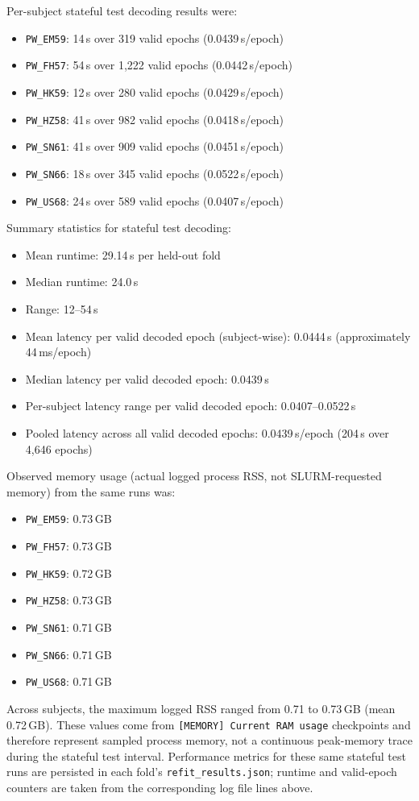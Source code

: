 Per-subject stateful test decoding results were:
\begin{itemize}
\item \texttt{PW\_EM59}: 14\,s over 319 valid epochs (0.0439\,s/epoch)
\item \texttt{PW\_FH57}: 54\,s over 1,222 valid epochs (0.0442\,s/epoch)
\item \texttt{PW\_HK59}: 12\,s over 280 valid epochs (0.0429\,s/epoch)
\item \texttt{PW\_HZ58}: 41\,s over 982 valid epochs (0.0418\,s/epoch)
\item \texttt{PW\_SN61}: 41\,s over 909 valid epochs (0.0451\,s/epoch)
\item \texttt{PW\_SN66}: 18\,s over 345 valid epochs (0.0522\,s/epoch)
\item \texttt{PW\_US68}: 24\,s over 589 valid epochs (0.0407\,s/epoch)
\end{itemize}

Summary statistics for stateful test decoding:
\begin{itemize}
\item Mean runtime: 29.14\,s per held-out fold
\item Median runtime: 24.0\,s
\item Range: 12--54\,s
\item Mean latency per valid decoded epoch (subject-wise): 0.0444\,s (approximately 44\,ms/epoch)
\item Median latency per valid decoded epoch: 0.0439\,s
\item Per-subject latency range per valid decoded epoch: 0.0407--0.0522\,s
\item Pooled latency across all valid decoded epochs: 0.0439\,s/epoch (204\,s over 4,646 epochs)
\end{itemize}
Observed memory usage (actual logged process RSS, not SLURM-requested memory) from the same runs was:
\begin{itemize}
\item \texttt{PW\_EM59}: 0.73\,GB
\item \texttt{PW\_FH57}: 0.73\,GB
\item \texttt{PW\_HK59}: 0.72\,GB
\item \texttt{PW\_HZ58}: 0.73\,GB
\item \texttt{PW\_SN61}: 0.71\,GB
\item \texttt{PW\_SN66}: 0.71\,GB
\item \texttt{PW\_US68}: 0.71\,GB
\end{itemize}
Across subjects, the maximum logged RSS ranged from 0.71 to 0.73\,GB (mean 0.72\,GB). These values come from \texttt{[MEMORY] Current RAM usage} checkpoints and therefore represent sampled process memory, not a continuous peak-memory trace during the stateful test interval.
Performance metrics for these same stateful test runs are persisted in each fold's \texttt{refit\_results.json}; runtime and valid-epoch counters are taken from the corresponding log file lines above.

